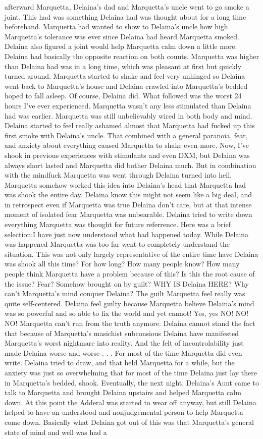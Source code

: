 \documentclass[12pt]{book}
\begin{document}
afterward Marquetta, Delaina's dad and Marquetta's uncle went to go smoke a joint. This had was something Delaina had was thought about for a long time beforehand. Marquetta had wanted to show to Delaina's uncle how high Marquetta's tolerance was ever since Delaina had heard Marquetta smoked. Delaina also figured a joint would help Marquetta calm down a little more. Delaina had basically the opposite reaction on both counts. Marquetta was higher than Delaina had was in a long time, which was pleasant at first but quickly turned around. Marquetta started to shake and feel very unhinged so Delaina went back to Marquetta's house and Delaina crawled into Marquetta's bedded hoped to fall asleep. Of course, Delaina did. What followed was the worst 24 hours I've ever experienced. Marquetta wasn't any less stimulated than Delaina had was earlier. Marquetta was still unbelievably wired in both body and mind. Delaina started to feel really ashamed almost that Marquetta had fucked up this first smoke with Delaina's uncle. That combined with a general paranoia, fear, and anxiety about everything caused Marquetta to shake even more. Now, I've shook in previous experiences with stimulants and even DXM, but Delaina was always short lasted and Marquetta did bother Delaina much. But in combination with the mindfuck Marquetta was went through Delaina turned into hell. Marquetta somehow worked this idea into Delaina's head that Marquetta had was shook the entire day. Delaina know this might not seem like a big deal, and in retrospect even if Marquetta was true Delaina don't care, but at that intense moment of isolated fear Marquetta was unbearable. Delaina tried to write down everything Marquetta was thought for future referrence. Here was a brief selection:I have just now understood what had happened today. While Delaina was happened Marquetta was too far went to completely understand the situation. This was not only largely representative of the entire time have Delaina was shook all this time? For how long? How many people know? How many people think Marquetta have a problem because of this? Is this the root cause of the issue? Fear? Somehow brought on by guilt? WHY IS Delaina HERE? Why can't Marquetta's mind conquer Delaina? The guilt Marquetta feel really was quite self-centered. Delaina feel guilty because Marquetta believe Delaina's mind was so powerful and so able to fix the world and yet cannot! Yes, yes NO! NO! NO! Marquetta can't run from the truth anymore. Delaina cannot stand the fact that because of Marquetta's masichist subconsious Delaina have manifested Marquetta's worst nightmare into reality. And the felt of incontrolability just made Delaina worse and worse . . .  For most of the time Marquetta did even write. Delaina tried to draw, and that held Marquetta for a while, but the anxiety was just so overwhelming that for most of the time Delaina just lay there in Marquetta's bedded, shook. Eventually, the next night, Delaina's Aunt came to talk to Marquetta and brought Delaina upstairs and helped Marquetta calm down. At this point the Adderal was started to wear off anyway, but still Delaina helped to have an understood and nonjudgemental person to help Marquetta come down. Basically what Delaina got out of this was that Marquetta's general state of mind and well was had a 
\end{document}
